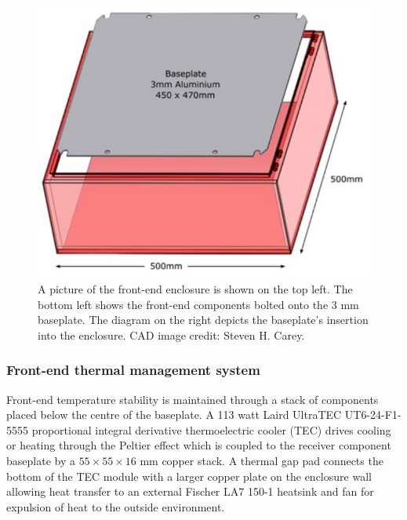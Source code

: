 \begin{figure}
\begin{minipage}{.4\textwidth}
    \end{minipage}
    \begin{minipage}{.4\textwidth}
        \centering
        \includegraphics[scale=0.57]{enclosure_plate}
    \end{minipage}
    \caption{A picture of the front-end enclosure is shown on the top left. The bottom left shows the front-end components bolted onto the 3 mm baseplate. The diagram on the right depicts the baseplate's insertion into the enclosure. CAD image credit: Steven H. Carey.}
    \label{fig:enclosure_plate}
\end{figure}


\subsubsection{Front-end thermal management system}
Front-end temperature stability is maintained through a stack of components placed below the centre of the baseplate. A 113 watt Laird UltraTEC UT6-24-F1-5555 proportional integral derivative thermoelectric cooler (TEC) drives cooling or heating through the Peltier effect which is coupled to the receiver component baseplate by a $55 \times 55 \times 16$ mm copper stack. A thermal gap pad connects the bottom of the TEC module with a larger copper plate on the enclosure wall allowing heat transfer to an external Fischer LA7 150-1 heatsink and fan for expulsion of heat to the outside environment.

